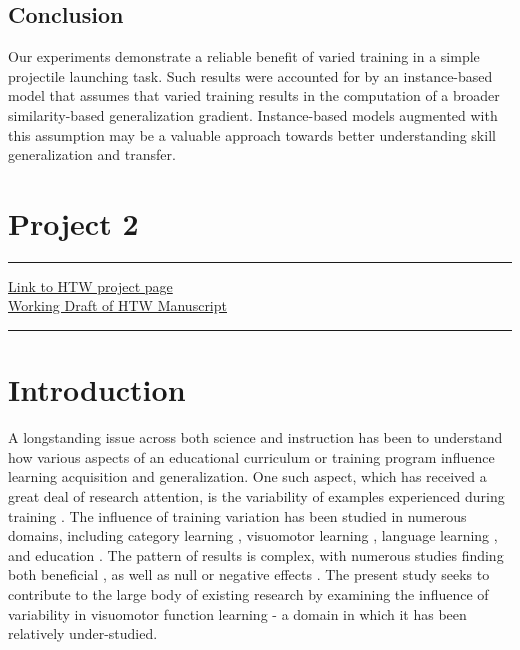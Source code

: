 \documentclass[
  12pt,
  letterpaper,
]{article}
\begin{document}
\subsection{Conclusion}\label{conclusion}

Our experiments demonstrate a reliable benefit of varied training in a
simple projectile launching task. Such results were accounted for by an
instance-based model that assumes that varied training results in the
computation of a broader similarity-based generalization gradient.
Instance-based models augmented with this assumption may be a valuable
approach towards better understanding skill generalization and transfer.

\section{Project 2}\label{project-2}

\begin{center}\rule{0.5\linewidth}{0.5pt}\end{center}

\href{https://tegorman13.github.io/htw/}{Link to HTW project page}\\

\href{https://tegorman13.github.io/htw/paper.html}{Working Draft of HTW
Manuscript}

\begin{center}\rule{0.5\linewidth}{0.5pt}\end{center}

\section{Introduction}\label{introduction-1}

A longstanding issue across both science and instruction has been to
understand how various aspects of an educational curriculum or training
program influence learning acquisition and generalization. One such
aspect, which has received a great deal of research attention, is the
variability of examples experienced during training
\autocite{ravivHowVariabilityShapes2022}. The influence of training
variation has been studied in numerous domains, including category
learning
\autocite{cohenCategoryVariabilityExemplar2001,posnerGenesisAbstractIdeas1968},
visuomotor learning \autocites{schmidtSchemaTheoryDiscrete1975}[
]{bernikerEffectsTrainingBreadth2014}, language learning
\autocite{perryLearnLocallyThink2010}, and education
\autocite{braithwaiteEffectsVariationPrior2015,guoEffectsExampleVariability2014}.
The pattern of results is complex, with numerous studies finding both
beneficial
\autocite{catalanoDistantTransferCoincident1984a,braunMotorTaskVariation2009,rollerVariablePracticeLenses2001},
as well as null or negative effects
\autocites{huHighvariabilityTrainingDoes2024,vanrossumSchmidtSchemaTheory1990}[
]{brekelmansDoesHighVariability2022}. The present study seeks to
contribute to the large body of existing research by examining the
influence of variability in visuomotor function learning - a domain in
which it has been relatively under-studied.
\end{document}
